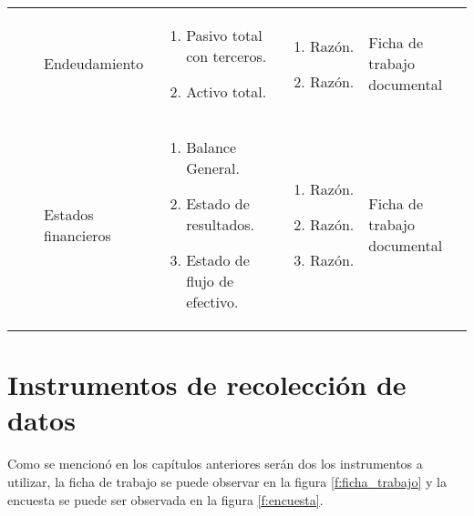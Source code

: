 \begin{sidewaystable}[htbp]
\begin{tabular}{|p{2.3cm}|p{3.5cm}|p{2.5cm}|p{5cm}|p{4cm}|p{3cm}|}
 & & Endeudamiento &
 \begin{enumerate}[nosep]
   \item Pasivo total con terceros.
   \item Activo total.
 \end{enumerate} &
 \begin{enumerate}[nosep]
   \item Razón.
   \item Razón.
 \end{enumerate} & Ficha de trabajo documental \\ \cline{3-6}
 & & Estados financieros &
 \begin{enumerate}[nosep]
   \item Balance General.
   \item Estado de resultados.
   \item Estado de flujo de efectivo.
 \end{enumerate} &
 \begin{enumerate}[nosep]
   \item Razón.
   \item Razón.
   \item Razón.
 \end{enumerate} & Ficha de trabajo documental \\ \hline
\end{tabular}
\end{sidewaystable}

\section{Instrumentos de recolección de datos}
Como se mencionó en los capítulos anteriores serán dos los instrumentos a utilizar,
la ficha de trabajo se puede observar en la figura \ref{f:ficha_trabajo} y la encuesta
se puede ser observada en la figura \ref{f:encuesta}.
